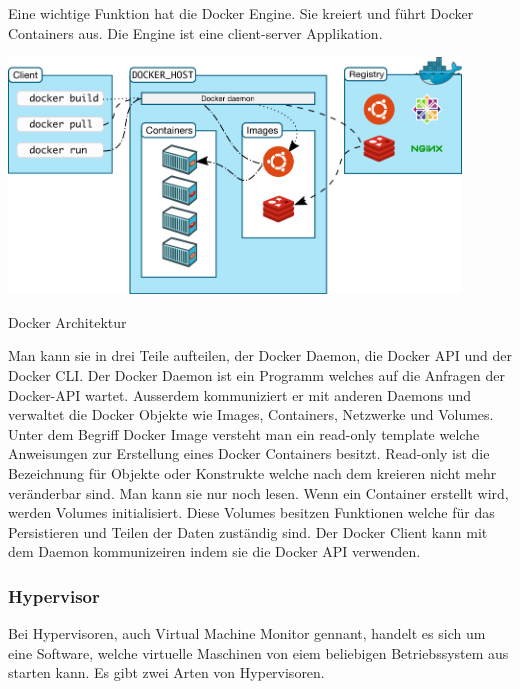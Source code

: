 \documentclass[10pt]{article}
\begin{document}
Eine wichtige Funktion hat die Docker Engine. Sie kreiert und führt Docker Containers aus.\cite{Engine} Die Engine ist eine client-server Applikation.\begin{floatingfigure}[r]{12cm}
    \centering
    \includegraphics[width=12cm]{Bilder/docker.png}
    \caption{Docker Architektur \cite{dockerEngine}}
\end{floatingfigure} Man kann sie in drei Teile aufteilen, der Docker Daemon, die Docker API und der Docker CLI. Der Docker Daemon ist ein Programm welches auf die Anfragen der Docker-API wartet. Ausserdem kommuniziert er mit anderen Daemons und verwaltet die Docker Objekte wie Images, Containers, Netzwerke und  Volumes. Unter dem Begriff Docker Image versteht man ein read-only template welche Anweisungen zur Erstellung eines Docker Containers besitzt.\cite{dockerEngine} Read-only ist die Bezeichnung für Objekte oder Konstrukte welche nach dem kreieren nicht mehr veränderbar sind. Man kann sie nur noch lesen.\cite{readOnly} Wenn ein Container erstellt wird, werden Volumes initialisiert. Diese Volumes besitzen Funktionen welche für das Persistieren und Teilen der Daten zuständig sind.\cite{volumes} Der Docker Client kann mit dem Daemon kommunizeiren indem sie die Docker API verwenden. 




\pagebreak

\subsubsection{Hypervisor}
Bei Hypervisoren, auch Virtual Machine Monitor gennant, handelt es sich um eine Software, welche virtuelle Maschinen von eiem beliebigen Betriebssystem aus starten kann. Es gibt zwei Arten von Hypervisoren.  \cite{hypervisor}
\end{document}

